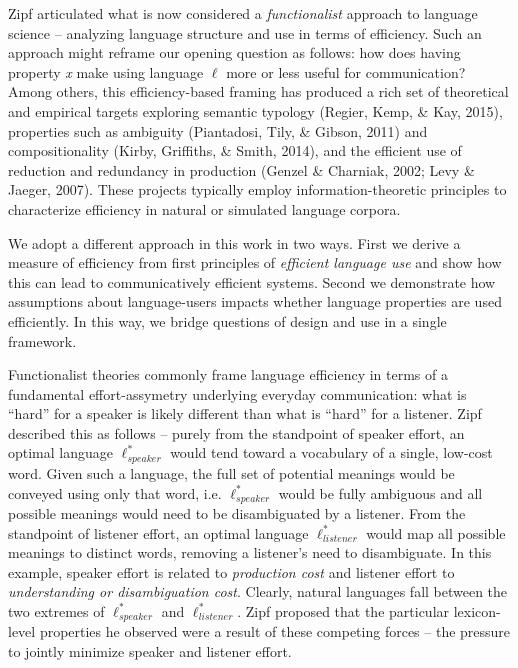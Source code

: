 \documentclass[10pt, letterpaper]{article}
\begin{document}
Zipf articulated what is now considered a \emph{functionalist} approach
to language science -- analyzing language structure and use in terms of
efficiency. Such an approach might reframe our opening question as
follows: how does having property \textit{x} make using language
\(\ell\) more or less useful for communication? Among others, this
efficiency-based framing has produced a rich set of theoretical and
empirical targets exploring semantic typology (Regier, Kemp, \& Kay,
2015), properties such as ambiguity (Piantadosi, Tily, \& Gibson, 2011)
and compositionality (Kirby, Griffiths, \& Smith, 2014), and the
efficient use of reduction and redundancy in production (Genzel \&
Charniak, 2002; Levy \& Jaeger, 2007). These projects typically employ
information-theoretic principles to characterize efficiency in natural
or simulated language corpora.\par

We adopt a different approach in this work in two ways. First we derive
a measure of efficiency from first principles of
\textit{efficient language use} and show how this can lead to
communicatively efficient systems. Second we demonstrate how assumptions
about language-users impacts whether language properties are used
efficiently. In this way, we bridge questions of design and use in a
single framework.\par

Functionalist theories commonly frame language efficiency in terms of a
fundamental effort-assymetry underlying everyday communication: what is
``hard'' for a speaker is likely different than what is ``hard'' for a
listener. Zipf described this as follows -- purely from the standpoint
of speaker effort, an optimal language \(\ell_{speaker}^*\) would tend
toward a vocabulary of a single, low-cost word. Given such a language,
the full set of potential meanings would be conveyed using only that
word, i.e. \(\ell_{speaker}^*\) would be fully ambiguous and all
possible meanings would need to be disambiguated by a listener. From the
standpoint of listener effort, an optimal language \(\ell_{listener}^*\)
would map all possible meanings to distinct words, removing a listener's
need to disambiguate. In this example, speaker effort is related to
\emph{production cost} and listener effort to \emph{understanding or
disambiguation cost}. Clearly, natural languages fall between the two
extremes of \(\ell_{speaker}^*\) and \(\ell_{listener}^*\). Zipf
proposed that the particular lexicon-level properties he observed were a
result of these competing forces -- the pressure to jointly minimize
speaker and listener effort.\par
\end{document}
